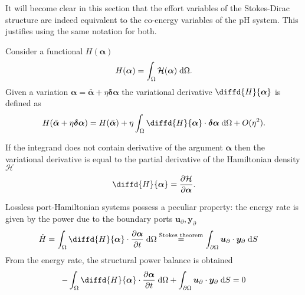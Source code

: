 \begin{remark}
	It will become clear in this section that the effort variables of the Stokes-Dirac structure are indeed equivalent to the co-energy variables of the pH system. This justifies using the same notation for both.
\end{remark}

\begin{definition}
Consider a functional $H(\bm{\alpha})$
\begin{equation*} 
H(\bm{\alpha}) = \int_{\Omega} \mathcal{H}(\bm{\alpha}) \d{\Omega}.
\end{equation*}
Given a variation $\bm{\alpha} = \bar{\bm{\alpha}} + \eta \bm{\delta\alpha}$ the variational derivative $\diffd{H}{\bm{\alpha}}$ is defined as
\begin{equation*}
H(\bar{\bm{\alpha}} + \eta \bm{\delta\alpha}) = H(\bar{\bm{\alpha}}) + \eta \int_{\Omega} \diffd{H}{\bm{\alpha}} \cdot \bm{\delta\alpha} \d{\Omega} + O(\eta^2).
\end{equation*}
\end{definition}
\begin{remark}
If the integrand does not contain derivative of the argument $\bm{\alpha}$ then the variational derivative is equal to the partial derivative of the Hamiltonian density $\mathcal{H}$
\begin{equation*}
\diffd{H}{\bm{\alpha}} = \diffp{\mathcal{H}}{\bm{\alpha}}.
\end{equation*}
\end{remark}


Lossless port-Hamiltonian systems possess a peculiar property: the energy rate is given by the power due to the boundary ports $\bm{u}_\partial, \bm{y}_\partial$
\begin{equation}\label{eq:enrate}
\begin{aligned}
\dot{H} &= \int_{\Omega} \diffd{H}{\bm{\alpha}} \cdot \diffp{\bm{\alpha}}{t} \d{\Omega} \stackrel{\text{Stokes theorem}}{=} \int_{\partial \Omega} \bm{u}_\partial \cdot \bm{y}_\partial \d{S} \
\end{aligned}
\end{equation} 
From the energy rate, the structural power balance is obtained
\begin{equation}\label{eq:strpow}
-\int_{\Omega} \diffd{H}{\bm{\alpha}} \cdot \diffp{\bm{\alpha}}{t} \d{\Omega} + \int_{\partial \Omega} \bm{u}_\partial \cdot \bm{y}_\partial \d{S} = 0
\end{equation}



